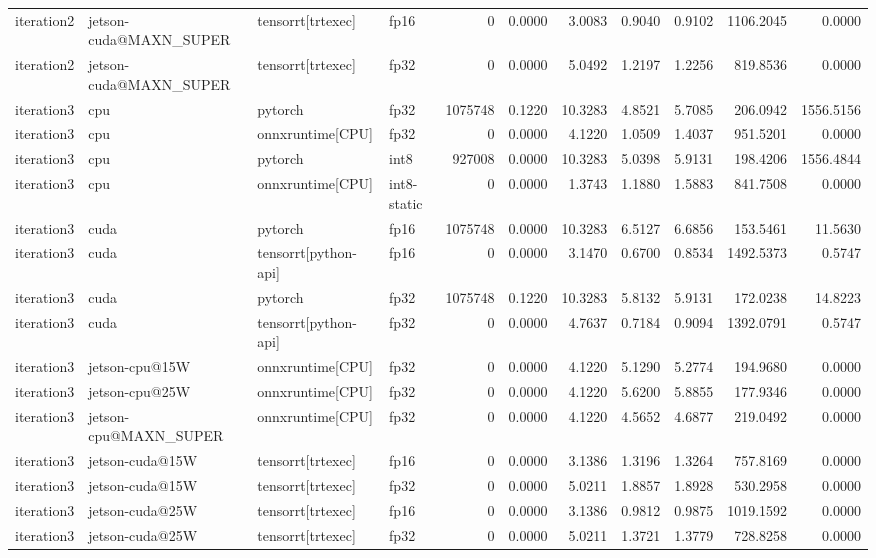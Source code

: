 \begin{table}
\begin{tabular}{llllrrrrrrr}
iteration2 & jetson-cuda@MAXN\_SUPER & tensorrt[trtexec] & fp16 & 0 & 0.0000 & 3.0083 & 0.9040 & 0.9102 & 1106.2045 & 0.0000 \\
iteration2 & jetson-cuda@MAXN\_SUPER & tensorrt[trtexec] & fp32 & 0 & 0.0000 & 5.0492 & 1.2197 & 1.2256 & 819.8536 & 0.0000 \\
iteration3 & cpu & pytorch & fp32 & 1075748 & 0.1220 & 10.3283 & 4.8521 & 5.7085 & 206.0942 & 1556.5156 \\
iteration3 & cpu & onnxruntime[CPU] & fp32 & 0 & 0.0000 & 4.1220 & 1.0509 & 1.4037 & 951.5201 & 0.0000 \\
iteration3 & cpu & pytorch & int8 & 927008 & 0.0000 & 10.3283 & 5.0398 & 5.9131 & 198.4206 & 1556.4844 \\
iteration3 & cpu & onnxruntime[CPU] & int8-static & 0 & 0.0000 & 1.3743 & 1.1880 & 1.5883 & 841.7508 & 0.0000 \\
iteration3 & cuda & pytorch & fp16 & 1075748 & 0.0000 & 10.3283 & 6.5127 & 6.6856 & 153.5461 & 11.5630 \\
iteration3 & cuda & tensorrt[python-api] & fp16 & 0 & 0.0000 & 3.1470 & 0.6700 & 0.8534 & 1492.5373 & 0.5747 \\
iteration3 & cuda & pytorch & fp32 & 1075748 & 0.1220 & 10.3283 & 5.8132 & 5.9131 & 172.0238 & 14.8223 \\
iteration3 & cuda & tensorrt[python-api] & fp32 & 0 & 0.0000 & 4.7637 & 0.7184 & 0.9094 & 1392.0791 & 0.5747 \\
iteration3 & jetson-cpu@15W & onnxruntime[CPU] & fp32 & 0 & 0.0000 & 4.1220 & 5.1290 & 5.2774 & 194.9680 & 0.0000 \\
iteration3 & jetson-cpu@25W & onnxruntime[CPU] & fp32 & 0 & 0.0000 & 4.1220 & 5.6200 & 5.8855 & 177.9346 & 0.0000 \\
iteration3 & jetson-cpu@MAXN\_SUPER & onnxruntime[CPU] & fp32 & 0 & 0.0000 & 4.1220 & 4.5652 & 4.6877 & 219.0492 & 0.0000 \\
iteration3 & jetson-cuda@15W & tensorrt[trtexec] & fp16 & 0 & 0.0000 & 3.1386 & 1.3196 & 1.3264 & 757.8169 & 0.0000 \\
iteration3 & jetson-cuda@15W & tensorrt[trtexec] & fp32 & 0 & 0.0000 & 5.0211 & 1.8857 & 1.8928 & 530.2958 & 0.0000 \\
iteration3 & jetson-cuda@25W & tensorrt[trtexec] & fp16 & 0 & 0.0000 & 3.1386 & 0.9812 & 0.9875 & 1019.1592 & 0.0000 \\
iteration3 & jetson-cuda@25W & tensorrt[trtexec] & fp32 & 0 & 0.0000 & 5.0211 & 1.3721 & 1.3779 & 728.8258 & 0.0000 \\

\end{tabular}
\end{table}

